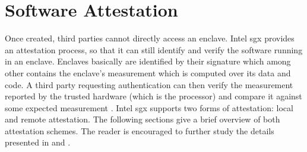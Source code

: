 \section{Software Attestation}
Once created, third parties cannot directly access an enclave. Intel \ac{sgx} provides an attestation process, so that it can still identify and verify the software running in an enclave.
Enclaves basically are identified by their signature which among other contains the enclave's measurement which is computed over its data and code. A third party requesting
authentication can then verify the measurement reported by the trusted hardware (which is the processor) and compare it against some expected measurement \cite{Costan2016IntelSE}.
Intel \ac{sgx} supports two forms of attestation: local and remote attestation. The following sections give a brief overview of both attestation schemes. The reader is encouraged to
further study the details presented in \cite{Costan2016IntelSE} and \cite{EnclaveWritersGuide}.

